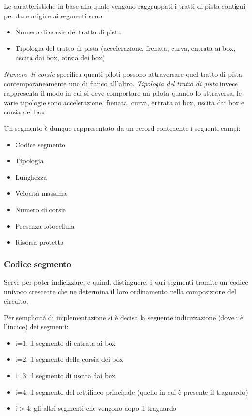 \documentclass[a4paper,11pt, twoside]{book}
\begin{document}
	Le caratteristiche in base alla quale vengono raggruppati i tratti di pista contigui per dare origine ai segmenti sono:
	\begin{itemize}
	  \item Numero di corsie del tratto di pista
	  \item Tipologia del tratto di pista (accelerazione, frenata, curva, entrata ai box, uscita dai box, corsia dei box)
	\end{itemize}
	
	\textsl{Numero di corsie} specifica quanti piloti possono attraversare quel tratto di pista contemporaneamente uno di
	fianco all'altro.
	\textsl{Tipologia del tratto di pista} invece rappresenta il modo in cui si deve comportare un pilota quando lo attraversa,
	le varie tipologie sono accelerazione, frenata, curva, entrata ai box, uscita dai box e corsia dei box.
	
	Un segmento è dunque rappresentato da un record contenente i seguenti campi:
	
	\begin{itemize}
	  \item Codice segmento
	  \item Tipologia
	  \item Lunghezza
	  \item Velocità massima
	  \item Numero di corsie
	  \item Presenza fotocellula
	  \item Risorsa protetta
	\end{itemize}
	
	\subsubsection{Codice segmento}
	  Serve per poter indicizzare, e quindi distinguere, i vari segmenti tramite un codice univoco 
	  crescente che ne determina il loro ordinamento
	  nella composizione del circuito. 

	  Per semplicità di implementazione si è decisa la seguente indicizzazione (dove i è l'indice) dei segmenti:
	  \begin{itemize}
	    \item i=1: il segmento di entrata ai box
	    \item i=2: il segmento della corsia dei box
	    \item i=3: il segmento di uscita dai box
	    \item i=4: il segmento del rettilineo principale (quello in cui è presente il traguardo)
	    \item i$>$4: gli altri segmenti che vengono dopo il traguardo
	  \end{itemize}
	  
\end{document}

